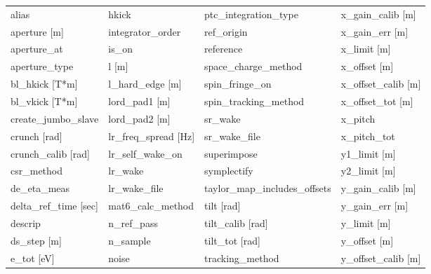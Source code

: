  \begin{tabular}{llll} \toprule
alias                          & hkick                          & ptc_integration_type           & x_gain_calib [m]               \\
aperture [m]                   & integrator_order               & ref_origin                     & x_gain_err [m]                 \\
aperture_at                    & is_on                          & reference                      & x_limit [m]                    \\
aperture_type                  & l [m]                          & space_charge_method            & x_offset [m]                   \\
bl_hkick [T*m]                 & l_hard_edge [m]                & spin_fringe_on                 & x_offset_calib [m]             \\
bl_vkick [T*m]                 & lord_pad1 [m]                  & spin_tracking_method           & x_offset_tot [m]               \\
create_jumbo_slave             & lord_pad2 [m]                  & sr_wake                        & x_pitch                        \\
crunch [rad]                   & lr_freq_spread [Hz]            & sr_wake_file                   & x_pitch_tot                    \\
crunch_calib [rad]             & lr_self_wake_on                & superimpose                    & y1_limit [m]                   \\
csr_method                     & lr_wake                        & symplectify                    & y2_limit [m]                   \\
de_eta_meas                    & lr_wake_file                   & taylor_map_includes_offsets    & y_gain_calib [m]               \\
delta_ref_time [sec]           & mat6_calc_method               & tilt [rad]                     & y_gain_err [m]                 \\
descrip                        & n_ref_pass                     & tilt_calib [rad]               & y_limit [m]                    \\
ds_step [m]                    & n_sample                       & tilt_tot [rad]                 & y_offset [m]                   \\
e_tot [eV]                     & noise                          & tracking_method                & y_offset_calib [m]             \\

\end{tabular}
